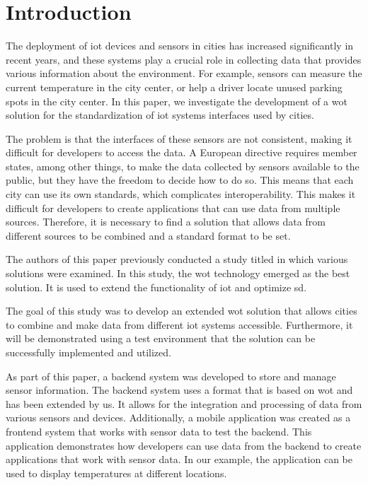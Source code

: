 \section{Introduction}\label{sec:introduction}

The deployment of \gls{iot} devices and sensors in cities has increased significantly in recent years, and these systems play a crucial role in collecting data that provides various information about the environment.
For example, sensors can measure the current temperature in the city center, or help a driver locate unused parking spots in the city center.
In this paper, we investigate the development of a \gls{wot} solution for the standardization of \gls{iot} systems interfaces used by cities.

The problem is that the interfaces of these sensors are not consistent, making it difficult for developers to access the data.
A European directive \autocite{digital-strategy.ec.europa.eu} requires member states, among other things, to make the data collected by sensors available to the public, but they have the freedom to decide how to do so.
This means that each city can use its own standards, which complicates interoperability. This makes it difficult for developers to create applications that can use data from multiple sources.
Therefore, it is necessary to find a solution that allows data from different sources to be combined and a standard format to be set.

The authors of this paper previously conducted a study titled  \autocite{Survey.Service.Discovery.in.Smart.Cities} in which various solutions were examined.
In this study, the \gls{wot} technology emerged as the best solution. It is used to extend the functionality of \gls{iot} and optimize \gls{sd}.

The goal of this study was to develop an extended \gls{wot} solution that allows cities to combine and make data from different \gls{iot} systems accessible.
Furthermore, it will be demonstrated using a test environment that the solution can be successfully implemented and utilized.

As part of this paper, a backend system was developed to store and manage sensor information.
The backend system uses a format that is based on \gls{wot} and has been extended by us.
It allows for the integration and processing of data from various sensors and devices.
Additionally, a mobile application was created as a frontend system that works with sensor data to test the backend.
This application demonstrates how developers can use data from the backend to create applications that work with sensor data.
In our example, the application can be used to display temperatures at different locations.

